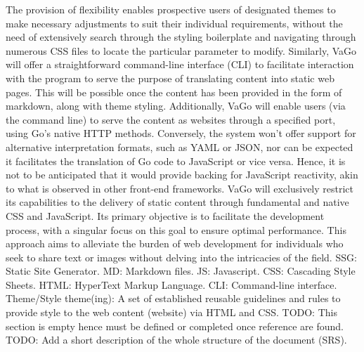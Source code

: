 {}The provision of flexibility enables prospective users of designated themes to make necessary adjustments to suit their individual requirements, without the need of extensively search through the styling boilerplate and navigating through numerous CSS files to locate the particular parameter to modify.\markdownRendererInterblockSeparator
{}Similarly, VaGo will offer a straightforward command-line interface (CLI) to facilitate interaction with the program to serve the purpose of translating content into static web pages. This will be possible once the content has been provided in the form of markdown, along with theme styling. Additionally, VaGo will enable users (via the command line) to serve the content as websites through a specified port, using Go's native HTTP methods.\markdownRendererInterblockSeparator
{}Conversely, the system won't offer support for alternative interpretation formats, such as YAML or JSON, nor can be expected it facilitates the translation of Go code to JavaScript or vice versa. Hence, it is not to be anticipated that it would provide backing for JavaScript reactivity, akin to what is observed in other front-end frameworks. VaGo will exclusively restrict its capabilities to the delivery of static content through fundamental and native CSS and JavaScript. Its primary objective is to facilitate the development process, with a singular focus on this goal to ensure optimal performance. This approach aims to alleviate the burden of web development for individuals who seek to share text or images without delving into the intricacies of the field.\markdownRendererInterblockSeparator
{}\markdownRendererInterblockSeparator
{}\markdownRendererUlBeginTight
\markdownRendererUlItem SSG: Static Site Generator.\markdownRendererUlItemEnd 
\markdownRendererUlItem MD: Markdown files.\markdownRendererUlItemEnd 
\markdownRendererUlItem JS: Javascript.\markdownRendererUlItemEnd 
\markdownRendererUlItem CSS: Cascading Style Sheets.\markdownRendererUlItemEnd 
\markdownRendererUlItem HTML: HyperText Markup Language.\markdownRendererUlItemEnd 
\markdownRendererUlItem CLI: Command-line interface.\markdownRendererUlItemEnd 
\markdownRendererUlItem Theme/Style theme(ing): A set of established reusable guidelines and rules to provide style to the web content (website) via HTML and CSS.\markdownRendererUlItemEnd 
\markdownRendererUlEndTight \markdownRendererInterblockSeparator
{}\markdownRendererInterblockSeparator
{}TODO: This section is empty hence must be defined or completed once reference are found. \markdownRendererInterblockSeparator
{}\markdownRendererInterblockSeparator
{}TODO: Add a short description of the whole structure of the document (SRS).\markdownRendererDocumentEnd